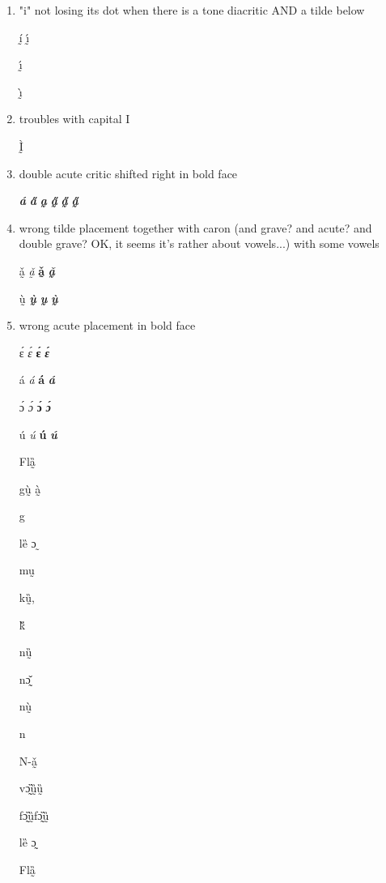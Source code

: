 \begin{enumerate}
  \item  "i" not losing its dot when there is a tone diacritic AND a tilde below

   ḭ́
   ı̰́

   ı̰́

   ı̰̀

  \item troubles with capital I

Ḭ̀

\item double acute critic shifted right in bold face

\textbf{\textit{á}}
\textbf{\textit{a̋}}
\textbf{\textit{a̰}}
\textbf{\textit{\H{a̰}}}
\textbf{\textit{a̰̋}}
\textbf{\textit{a̰̋}}

\item wrong tilde placement together with caron (and grave? and acute? and double grave? OK, it seems it's rather about vowels...) with some vowels

ǎ̰
\textit{ǎ̰}
\textbf{ǎ̰}
\textit{\textbf{ǎ̰}}

ṵ̀
\textbf{\textit{ṵ̀}}
\textbf{\textit{ṵ}}
\textbf{\textit{ṵ̀}}
\item wrong acute placement in bold face

ɛ́
\textit{ɛ́}
\textbf{ɛ́}
\textit{\textbf{ɛ́}}

á
\textit{á}
\textbf{á}
\textit{\textbf{á}}

ɔ́
\textit{ɔ́}
\textbf{ɔ́}
\textit{\textbf{ɔ́}}

ú
\textit{ú}
\textbf{ú}
\textit{\textbf{ú}}

{
\itshape

Flȁ̰


gṵ̀ à̰

g{\ù}{\à}


lȅ ɔ ̰

mṵ

kṵ̏,

k{\ȕ}

nṵ̏

nɔ̰̌

 nṵ̀

 n{\ù}

 N-ǎ̰

 vɔ̰̏ṵ̏ṵ̏

 fɔ̰̏ṵ̏fɔ̰̏ṵ̏

 lȅ ɔ̰

 }


{
\itshape\bfseries


Flȁ̰


}
\end{enumerate}
